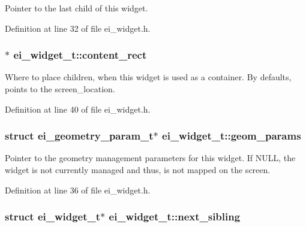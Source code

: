 Pointer to the last child of this widget. 

Definition at line 32 of file ei\_\-widget.h.\hypertarget{structei__widget__t_a75c29d388a5f5b32cdd8a9c855bc2a75}{
\subsubsection[{content\_\-rect}]{$\ast$ {\bf ei\_\-widget\_\-t::content\_\-rect}}}
\label{structei__widget__t_a75c29d388a5f5b32cdd8a9c855bc2a75}


Where to place children, when this widget is used as a container. By defaults, points to the screen\_\-location. 

Definition at line 40 of file ei\_\-widget.h.\hypertarget{structei__widget__t_a31885277c641803a931fff1d6256203f}{
\subsubsection[{geom\_\-params}]{\setlength{\rightskip}{0pt plus 5cm}struct {\bf ei\_\-geometry\_\-param\_\-t}$\ast$ {\bf ei\_\-widget\_\-t::geom\_\-params}}}
\label{structei__widget__t_a31885277c641803a931fff1d6256203f}


Pointer to the geometry management parameters for this widget. If NULL, the widget is not currently managed and thus, is not mapped on the screen. 

Definition at line 36 of file ei\_\-widget.h.\hypertarget{structei__widget__t_ada15cedaf8e6e104a1461c1754ff6cb3}{
\subsubsection[{next\_\-sibling}]{\setlength{\rightskip}{0pt plus 5cm}struct {\bf ei\_\-widget\_\-t}$\ast$ {\bf ei\_\-widget\_\-t::next\_\-sibling}}}
\label{structei__widget__t_ada15cedaf8e6e104a1461c1754ff6cb3}


